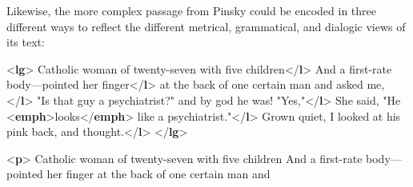 Likewise, the more complex passage from Pinsky could be encoded in three different ways to reflect the different metrical, grammatical, and dialogic views of its text: \par\bgroup{}\exampleFont \begin{shaded}\noindent\mbox{}{<\textbf{lg}>}\mbox{}\newline 
{}Catholic woman of twenty-seven with five children{</\textbf{l}>}\mbox{}\newline 
{}And a first-rate body—pointed her finger{</\textbf{l}>}\mbox{}\newline 
{}at the back of one certain man and asked me,{</\textbf{l}>}\mbox{}\newline 
{}"Is that guy a psychiatrist?" and by god he was! "Yes,"{</\textbf{l}>}\mbox{}\newline 
{}She said, "He {<\textbf{emph}>}looks{</\textbf{emph}>} like a psychiatrist."{</\textbf{l}>}\mbox{}\newline 
{}Grown quiet, I looked at his pink back, and thought.{</\textbf{l}>}\mbox{}\newline 
{</\textbf{lg}>}\end{shaded}\egroup\par \noindent  \par\bgroup{}\exampleFont \begin{shaded}\noindent\mbox{}{<\textbf{p}>}\mbox{}\newline 
{}Catholic woman of twenty-seven with five children And a\mbox{}\newline 
\hspace*{1em}\hspace*{1em} first-rate body—pointed her finger at the back of one certain man and\mbox{}\newline 

\end{shaded}
